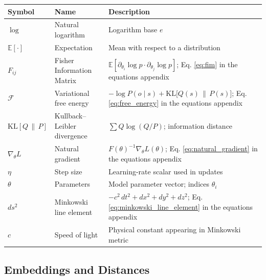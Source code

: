 \documentclass[
  10pt,
]{article}
\newcounter{none} %
\begin{document}
{\def\LTcaptype{none} %
\begin{longtable}[]{@{}
  >{\raggedright\arraybackslash}p{}
  >{\raggedright\arraybackslash}p{}
  >{\raggedright\arraybackslash}p{}@{}}
\toprule\noalign{}
\begin{minipage}[b]{\linewidth}\raggedright
Symbol
\end{minipage} & \begin{minipage}[b]{\linewidth}\raggedright
Name
\end{minipage} & \begin{minipage}[b]{\linewidth}\raggedright
Description
\end{minipage} \\
\midrule\noalign{}
\endhead
\bottomrule\noalign{}
\endlastfoot
\(\log\) & Natural logarithm & Logarithm base \(e\) \\
\(\mathbb{E}[\cdot]\) & Expectation & Mean with respect to a
distribution \\
\(F_{ij}\) & Fisher Information Matrix &
\(\mathbb{E}[\partial_{\theta_i}\log p \cdot \partial_{\theta_j}\log p]\);
Eq. \eqref{eq:fim} in the equations appendix \\
\(\mathcal{F}\) & Variational free energy &
\(-\log P(o\mid s) + \mathrm{KL}\big[Q(s)\,\|\,P(s)\big]\); Eq.
\eqref{eq:free_energy} in the equations appendix \\
\(\mathrm{KL}[Q\,\|\,P]\) & Kullback--Leibler divergence &
\(\sum Q\log(Q/P)\); information distance \\
\(\nabla_{\theta} L\) & Natural gradient &
\(F(\theta)^{-1} \nabla_{\theta} L(\theta)\); Eq.
\eqref{eq:natural_gradient} in the equations appendix \\
\(\eta\) & Step size & Learning-rate scalar used in updates \\
\(\theta\) & Parameters & Model parameter vector; indices
\(\theta_i\) \\
\(ds^2\) & Minkowski line element & \(-c^2\,dt^2 + dx^2 + dy^2 + dz^2\);
Eq. \eqref{eq:minkowski_line_element} in the equations appendix \\
\(c\) & Speed of light & Physical constant appearing in Minkowski
metric \\
\end{longtable}
}

\subsection{Embeddings and Distances}\label{embeddings-and-distances}
\end{document}
